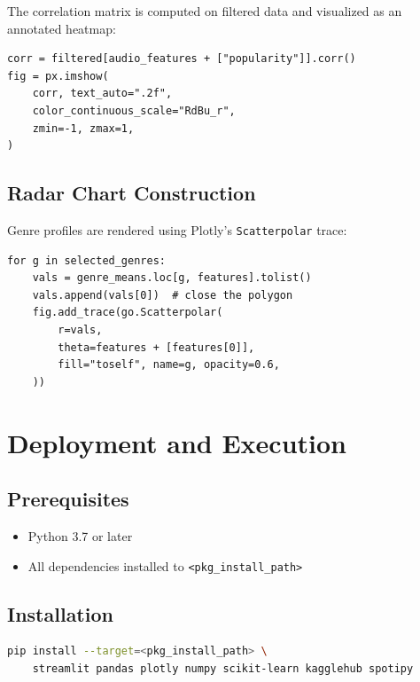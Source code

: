 \documentclass[12pt,a4paper]{article}
\begin{document}
The correlation matrix is computed on filtered data and visualized as an annotated heatmap:

\begin{lstlisting}[style=pythonstyle, caption={Correlation heatmap}]
corr = filtered[audio_features + ["popularity"]].corr()
fig = px.imshow(
    corr, text_auto=".2f",
    color_continuous_scale="RdBu_r",
    zmin=-1, zmax=1,
)
\end{lstlisting}

\subsection{Radar Chart Construction}

Genre profiles are rendered using Plotly's \texttt{Scatterpolar} trace:

\begin{lstlisting}[style=pythonstyle, caption={Radar chart for genre comparison}]
for g in selected_genres:
    vals = genre_means.loc[g, features].tolist()
    vals.append(vals[0])  # close the polygon
    fig.add_trace(go.Scatterpolar(
        r=vals,
        theta=features + [features[0]],
        fill="toself", name=g, opacity=0.6,
    ))
\end{lstlisting}

\section{Deployment and Execution}

\subsection{Prerequisites}

\begin{itemize}[noitemsep]
    \item Python 3.7 or later
    \item All dependencies installed to \texttt{<pkg\_install\_path>}
\end{itemize}

\subsection{Installation}

\begin{lstlisting}[language=bash, style=pythonstyle, caption={Package installation}]
pip install --target=<pkg_install_path> \
    streamlit pandas plotly numpy scikit-learn kagglehub spotipy
\end{lstlisting}
\end{document}
